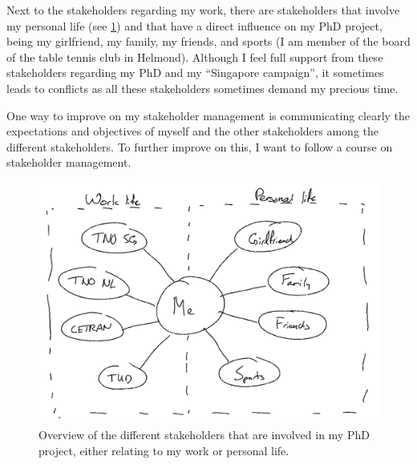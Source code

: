 \begin{itemize}
	Next to the stakeholders regarding my work, there are stakeholders that involve my personal life (see \cref{fig:stakeholders}) and that have a direct influence on my PhD project, being my girlfriend, my family, my friends, and sports (I am member of the board of the table tennis club in Helmond). Although I feel full support from these stakeholders regarding my PhD and my ``Singapore campaign'', it sometimes leads to conflicts as all these stakeholders sometimes demand my precious time.
	
	One way to improve on my stakeholder management is communicating clearly the expectations and objectives of myself and the other stakeholders among the different stakeholders. To further improve on this, I want to follow a course on stakeholder management.
\end{itemize}

\begin{figure}
	\centering
	\includegraphics[width=\linewidth]{figures/stakeholders}
	\caption{Overview of the different stakeholders that are involved in my PhD project, either relating to my work or personal life.}
	\label{fig:stakeholders} 
\end{figure}

